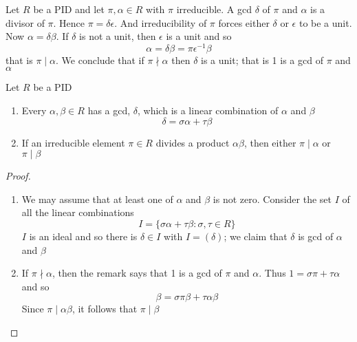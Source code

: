 \documentclass[11pt]{article}
\begin{document}
\begin{remark}
Let \(R\) be a PID and let \(\pi,\alpha\in R\) with \(\pi\) irreducible. A gcd \(\delta\) of
\(\pi\) and \(\alpha\) is a divisor of \(\pi\). Hence \(\pi=\delta\epsilon\). And
irreducibility of \(\pi\) forces either \(\delta\) or \(\epsilon\) to be a unit. Now
\(\alpha=\delta\beta\). If \(\delta\) is not a unit, then \(\epsilon\) is a unit and so 
\begin{equation*}
\alpha=\delta\beta=\pi\epsilon^{-1}\beta
\end{equation*}
that is \(\pi\mid\alpha\). We conclude that if \(\pi\nmid\alpha\) then \(\delta\) is a
unit; that is 1 is a gcd of \(\pi\) and \(\alpha\)
\end{remark}

\begin{theorem}[]
\label{thm3.57}
Let \(R\) be a PID
\begin{enumerate}
\item Every \(\alpha,\beta\in R\) has a gcd, \(\delta\), which is a linear combination of
\(\alpha\) and \(\beta\)
\begin{equation*}
\delta=\sigma\alpha+\tau\beta
\end{equation*}
\item If an irreducible element \(\pi\in R\) divides a product \(\alpha\beta\), then
either \(\pi\mid\alpha\) or \(\pi\mid\beta\)
\end{enumerate}
\end{theorem}
\begin{proof}
\begin{enumerate}
\item We may assume that at least one of \(\alpha\) and \(\beta\) is not zero. Consider the set \(I\)
of all the linear combinations
\begin{equation*}
I=\{\sigma\alpha+\tau\beta:\sigma,\tau\in R\}
\end{equation*}
\(I\) is an ideal and so there is \(\delta\in I\) with \(I=(\delta)\); we claim
that \(\delta\) is gcd of \(\alpha\) and \(\beta\)
\item If \(\pi\nmid\alpha\), then the remark says that 1 is a gcd of \(\pi\) and \(\alpha\).
Thus \(1=\sigma\pi+\tau\alpha\) and so
\begin{equation*}
\beta=\sigma\pi\beta+\tau\alpha\beta
\end{equation*}
Since \(\pi\mid\alpha\beta\), it follows that \(\pi\mid\beta\)
\end{enumerate}
\end{proof}
\end{document}
